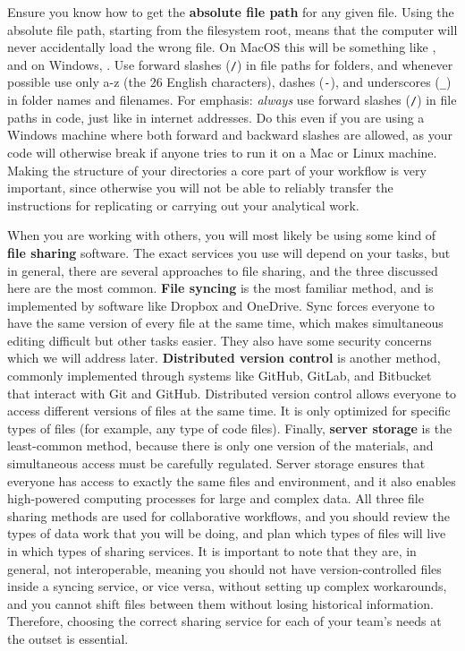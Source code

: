 Ensure you know how to get the \textbf{absolute file path} for any given file.
Using the absolute file path, starting from the filesystem root,
means that the computer will never accidentally load the wrong file.
On MacOS this will be something like ,
and on Windows, .
Use forward slashes (\texttt{/}) in file paths for folders,
and whenever possible use only a-z (the 26 English characters),
dashes (\texttt{-}), and underscores (\texttt{\_}) in folder names and filenames.
For emphasis: \textit{always} use forward slashes (\texttt{/}) in file paths in code,
just like in internet addresses. Do this even if you are using a Windows machine where
both forward and backward slashes are allowed, as your code will otherwise break
if anyone tries to run it on a Mac or Linux machine.
Making the structure of your directories a core part of your workflow is very important,
since otherwise you will not be able to reliably transfer the instructions
for replicating or carrying out your analytical work.

When you are working with others, you will most likely be using
some kind of \textbf{file sharing} software.
The exact services you use will depend on your tasks,
but in general, there are several approaches to file sharing,
and the three discussed here are the most common.
\textbf{File syncing} is the most familiar method,
and is implemented by software like Dropbox and OneDrive.
Sync forces everyone to have the same version of every file at the same time,
which makes simultaneous editing difficult but other tasks easier.
They also have some security concerns which we will address later.
\textbf{Distributed version control} is another method,
commonly implemented through systems like GitHub, GitLab, and Bitbucket
that interact with Git and GitHub.
Distributed version control allows everyone
to access different versions of files at the same time.
It is only optimized for specific types of files
(for example, any type of code files).
Finally, \textbf{server storage} is the least-common method,
because there is only one version of the materials,
and simultaneous access must be carefully regulated.
Server storage ensures that everyone has access
to exactly the same files and environment, and it also enables
high-powered computing processes for large and complex data.
All three file sharing methods are used for collaborative workflows,
and you should review the types of data work
that you will be doing, and plan which types of files
will live in which types of sharing services.
It is important to note that they are, in general, not interoperable,
meaning you should not have version-controlled files inside a syncing service,
or vice versa, without setting up complex workarounds,
and you cannot shift files between them without losing historical information.
Therefore, choosing the correct sharing service for each of your team's needs at the outset is essential.

